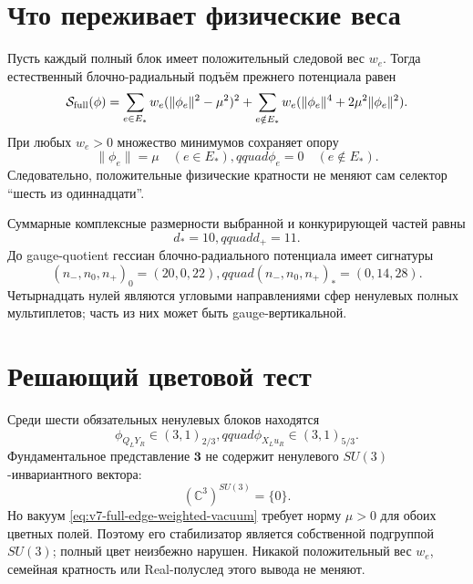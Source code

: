 \section{Что переживает физические веса}

Пусть каждый полный блок имеет положительный следовой вес $w_e$. Тогда
естественный блочно-радиальный подъём прежнего потенциала равен
\begin{equation}
 \mathcal S_{\rm full}(\phi)
 =\sum_{e\in E_*}w_e(\|\phi_e\|^2-\mu^2)^2
 +\sum_{e\notin E_*}w_e
 (\|\phi_e\|^4+2\mu^2\|\phi_e\|^2).
 \label{eq:v7-full-edge-weighted-potential}
\end{equation}
При любых $w_e>0$ множество минимумов сохраняет опору
\begin{equation}
 \|\phi_e\|=\mu\quad(e\in E_*),qquad
 \phi_e=0\quad(e\notin E_*).
 \label{eq:v7-full-edge-weighted-vacuum}
\end{equation}
Следовательно, положительные физические кратности не меняют сам селектор
``шесть из одиннадцати''.

Суммарные комплексные размерности выбранной и конкурирующей частей равны
\begin{equation}
 d_* =10,qquad d_+=11.
 \label{eq:v7-full-edge-dimensions}
\end{equation}
До gauge-quotient гессиан блочно-радиального потенциала имеет сигнатуры
\begin{equation}
 (n_-,n_0,n_+)_{0}=(20,0,22),qquad
 (n_-,n_0,n_+)_{*}=(0,14,28).
 \label{eq:v7-full-edge-hessian-signatures}
\end{equation}
Четырнадцать нулей являются угловыми направлениями сфер ненулевых полных
мультиплетов; часть из них может быть gauge-вертикальной.

\section{Решающий цветовой тест}

Среди шести обязательных ненулевых блоков находятся
\begin{equation}
 \phi_{Q_LY_R}\in(3,1)_{2/3},qquad
 \phi_{X_Lu_R}\in(3,1)_{5/3}.
 \label{eq:v7-full-edge-selected-colored-fields}
\end{equation}
Фундаментальное представление $\mathbf3$ не содержит ненулевого
$SU(3)$-инвариантного вектора:
\begin{equation}
 (\mathbb C^3)^{SU(3)}=\{0\}.
 \label{eq:v7-full-edge-no-color-invariant-vector}
\end{equation}
Но вакуум \eqref{eq:v7-full-edge-weighted-vacuum} требует норму $\mu>0$
для обоих цветных полей. Поэтому его стабилизатор является собственной
подгруппой $SU(3)$; полный цвет неизбежно нарушен. Никакой положительный
вес $w_e$, семейная кратность или Real-полуслед этого вывода не меняют.


